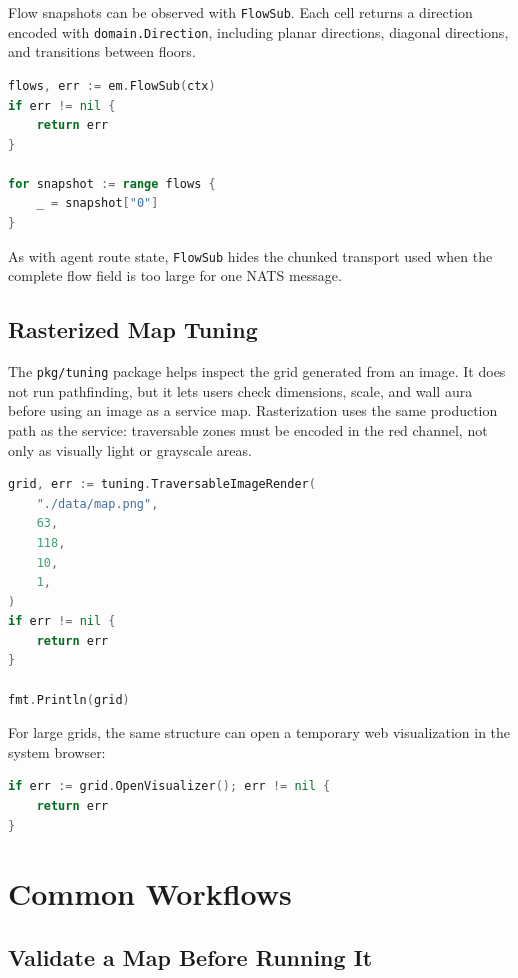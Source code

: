 \documentclass[12pt,a4paper]{report}
\begin{document}
Flow snapshots can be observed with \texttt{FlowSub}. Each cell returns a
direction encoded with \texttt{domain.Direction}, including planar directions,
diagonal directions, and transitions between floors.

\begin{lstlisting}[language=Go]
flows, err := em.FlowSub(ctx)
if err != nil {
    return err
}

for snapshot := range flows {
    _ = snapshot["0"]
}
\end{lstlisting}

As with agent route state, \texttt{FlowSub} hides the chunked transport used when
the complete flow field is too large for one NATS message.

\subsection{Rasterized Map Tuning}

The \texttt{pkg/tuning} package helps inspect the grid generated from an image.
It does not run pathfinding, but it lets users check dimensions, scale, and wall
aura before using an image as a service map. Rasterization uses the same
production path as the service: traversable zones must be encoded in the red
channel, not only as visually light or grayscale areas.

\begin{lstlisting}[language=Go]
grid, err := tuning.TraversableImageRender(
    "./data/map.png",
    63,
    118,
    10,
    1,
)
if err != nil {
    return err
}

fmt.Println(grid)
\end{lstlisting}

For large grids, the same structure can open a temporary web visualization in
the system browser:

\begin{lstlisting}[language=Go]
if err := grid.OpenVisualizer(); err != nil {
    return err
}
\end{lstlisting}

\section{Common Workflows}

\subsection{Validate a Map Before Running It}
\end{document}
